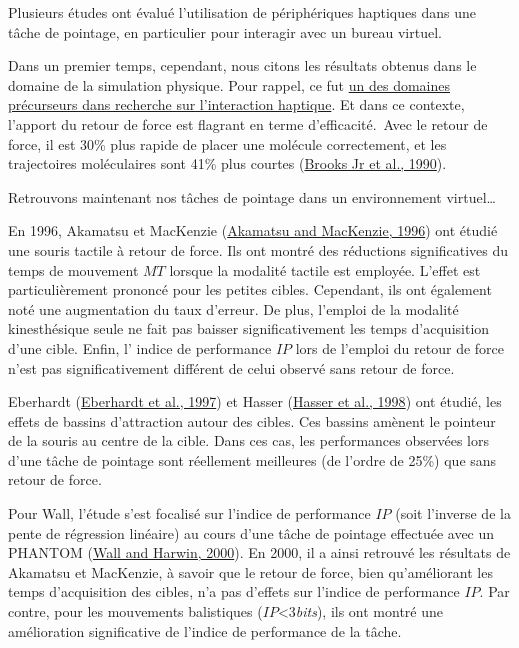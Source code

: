 \documentclass[
]{book}
\begin{document}
Plusieurs études ont évalué l'utilisation de périphériques haptiques dans
une tâche de pointage, en particulier pour interagir avec un bureau
virtuel.

Dans un premier temps, cependant, nous citons les résultats obtenus dans
le domaine de la simulation physique. Pour rappel, ce fut \href{\ref{historique}}{un des domaines
précurseurs dans recherche sur l'interaction haptique}. Et
dans ce contexte, l'apport du retour de force est flagrant en terme
d'efficacité.~Avec le retour de force, il est 30\% plus rapide de placer
une molécule correctement, et les trajectoires moléculaires sont 41\% plus
courtes (\protect\hyperlink{ref-brooks1990project}{Brooks Jr et al., 1990}).

Retrouvons maintenant nos tâches de pointage dans un environnement virtuel\ldots{}

En 1996, Akamatsu et MacKenzie (\protect\hyperlink{ref-akamatsu1996movement}{Akamatsu and MacKenzie, 1996}) ont étudié une souris
tactile à retour de force. Ils ont montré des réductions significatives du
temps de mouvement \(MT\) lorsque la modalité tactile est employée. L'effet est
particulièrement prononcé pour les petites cibles. Cependant, ils ont
également noté une augmentation du taux d'erreur. De plus, l'emploi de la
modalité kinesthésique seule ne fait pas baisser significativement les temps
d'acquisition d'une cible. Enfin, l' indice de performance \(IP\) lors de
l'emploi du retour de force n'est pas significativement différent de celui
observé sans retour de force.

Eberhardt (\protect\hyperlink{ref-eberhardt1997force}{Eberhardt et al., 1997}) et Hasser (\protect\hyperlink{ref-hasser1998user}{Hasser et al., 1998}) ont étudié,
les effets de bassins d'attraction autour des cibles. Ces bassins amènent
le pointeur de la souris au centre de la cible. Dans ces cas, les performances
observées lors d'une tâche de pointage sont réellement meilleures (de l'ordre
de 25\%) que sans retour de force.

Pour Wall, l'étude s'est focalisé sur l'indice de performance \(IP\) (soit
l'inverse de la pente de régression linéaire) au cours d'une tâche de
pointage effectuée avec un PHANTOM (\protect\hyperlink{ref-wall2000quantification}{Wall and Harwin, 2000}). En 2000, il
a ainsi retrouvé les résultats de Akamatsu et MacKenzie, à savoir que le
retour de force, bien qu'améliorant les temps d'acquisition des cibles, n'a
pas d'effets sur l'indice de performance \(IP\). Par contre, pour les
mouvements balistiques (\(IP\)\textless3\emph{bits}), ils ont montré une amélioration
significative de l'indice de performance de la tâche.
\end{document}
